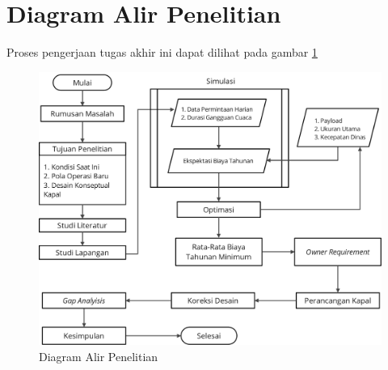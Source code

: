 \section{Diagram Alir Penelitian}
\label{sec:diagram-alir}

Proses pengerjaan tugas akhir ini dapat dilihat pada gambar \ref{fig:diagramkerja} 


\begin{figure}[ht]
  \centering
  \includegraphics[scale=0.75]{gambar/FCV4 Potrait.png}
  \caption{Diagram Alir Penelitian}
  \label{fig:diagramkerja}
\end{figure}